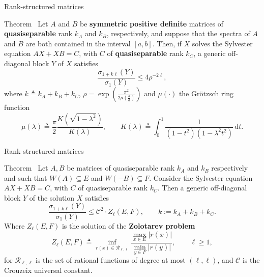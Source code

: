 \documentclass[aspectratio=169,xcolor=dvipsnames]{beamer}
\begin{document}
	\begin{frame}{Rank-structured matrices}
	
	\begin{alertblock}{Theorem~\parencite[Theorem~2.7]{MR3867617}}\small
	Let $A$ and $B$ be  \textbf{symmetric positive definite} matrices of \textbf{quasiseparable}
	rank $k_A$ and $k_B$, respectively, and
	suppose that the spectra of $A$ and $B$ are both contained in the interval $[a,b]$. Then,
	if $X$ solves the Sylvester equation $AX + XB = C$, with $C$ of
	\textbf{quasiseparable} rank $k_C$, a generic off-diagonal block $Y$ of
	$X$ satisfies
	\[
	\frac{\sigma_{1 + k\ell}(Y)}{\sigma_1(Y)} \leq 4\rho^{-2\ell},
	\]
	where $k\triangleq k_A+k_B+k_C$,
	$\rho=\operatorname{exp}\left(\frac{\pi^2}{2\mu(\frac ba)}\right)$ and $\mu(\cdot)$ the Gr\"otzsch ring function
	\[
	\mu(\lambda)\triangleq \frac{\pi}{2} \frac{K(\sqrt{1-\lambda^2})}{K(\lambda)},\qquad K(\lambda)\triangleq\int_0^1\frac{1}{(1-t^2)(1-\lambda^2t^2)}\,\mathrm{d}t.
	\]
	\end{alertblock}

	
	\end{frame}

	\begin{frame}{Rank-structured matrices}
	
	\begin{alertblock}{Theorem~\parencite[Theorem~2.12]{MR3867617}}
	Let $A, B$ be matrices of quasiseparable
	rank $k_A$ and $k_B$ respectively and such that $W(A) \subseteq E$ and 
	$W(-B) \subseteq F$. Consider 
	the Sylvester equation $AX + XB = C$, with $C$ of
	quasiseparable rank $k_C$. Then a generic off-diagonal block $Y$ of
	the solution $X$ satisfies
	\[
	\frac{\sigma_{1 + k\ell}(Y)}{\sigma_1(Y)} \leq \mathcal C^2\cdot Z_{\ell}(E, F), \qquad k:=k_A+k_B+k_C. 
	\]
	Where $Z_{\ell}(E, F)$ is the solution of the \textbf{Zolotarev problem} 
	\[Z_\ell(E, F) \triangleq \inf_{r(x) \in \mathcal R_{\ell,\ell}}
	\frac{\max_{x \in E} |r(x)|}{\min_{y \in F} |r(y)|}, \qquad
	\ell \geq 1, 
	\]
	for $\mathcal R_{\ell,\ell}$ is the set of rational functions of degree
	at most $(\ell,\ell)$, and $\mathcal{C}$ is the Crouzeix universal constant.
	\end{alertblock}
	
	\end{frame}
\end{document}
